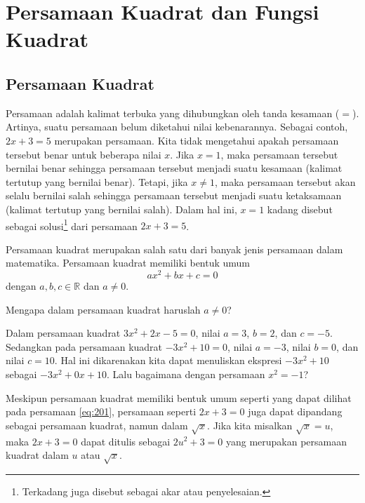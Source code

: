 \chapter{Persamaan Kuadrat dan Fungsi Kuadrat}
\label{sec:second}


\section{Persamaan Kuadrat}

Persamaan adalah kalimat terbuka yang dihubungkan oleh tanda kesamaan ($ = $). Artinya, suatu persamaan belum diketahui nilai kebenarannya. Sebagai contoh, $ 2x + 3 = 5 $ merupakan persamaan. Kita tidak mengetahui apakah persamaan tersebut benar untuk beberapa nilai $ x $. Jika $ x = 1 $, maka persamaan tersebut bernilai benar sehingga persamaan tersebut menjadi suatu kesamaan (kalimat tertutup yang bernilai benar). Tetapi, jika $ x \ne 1 $, maka persamaan tersebut akan selalu bernilai salah sehingga persamaan tersebut menjadi suatu ketaksamaan (kalimat tertutup yang bernilai salah). Dalam hal ini, $ x = 1 $ kadang disebut sebagai solusi\footnote{Terkadang juga disebut sebagai akar atau penyelesaian.} dari persamaan $ 2x + 3 = 5 $.

\par Persamaan kuadrat merupakan salah satu dari banyak jenis persamaan dalam matematika. Persamaan kuadrat memiliki bentuk umum
\begin{equation} \label{eq:201}
	ax^{2} + bx + c = 0
\end{equation}
dengan $ a, b, c \in \mathbb{R} $ dan $ a \ne 0 $.

\begin{explbox}
	Mengapa dalam persamaan kuadrat haruslah $ a \ne 0 $?
\end{explbox}

\par Dalam persamaan kuadrat $ 3x^{2} + 2x - 5 = 0 $, nilai $ a = 3 $, $ b = 2 $, dan $ c = -5 $. Sedangkan pada persamaan kuadrat $ -3x^{2} + 10 = 0 $, nilai $ a = -3 $, nilai $ b = 0 $, dan nilai $ c = 10 $. Hal ini dikarenakan kita dapat menuliskan ekspresi $ -3x^{2} + 10 $ sebagai $ -3x^{2} + 0x + 10 $. Lalu bagaimana dengan persamaan $ x^{2} = -1 $?

\par Meskipun persamaan kuadrat memiliki bentuk umum seperti yang dapat dilihat pada persamaan \ref{eq:201}, persamaan seperti $ 2x + 3 = 0 $ juga dapat dipandang sebagai persamaan kuadrat, namun dalam $ \sqrt{x} $. Jika kita misalkan $ \sqrt{x} = u $, maka $ 2x + 3 = 0 $ dapat ditulis sebagai $ 2u^{2} + 3 = 0 $ yang merupakan persamaan kuadrat dalam $ u $ atau $ \sqrt{x} $.

